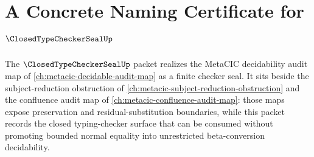 \chapter{A Concrete Naming Certificate for $\ClosedTypeCheckerSealUp$}
\label{ch:concrete-instances-closed-type-checker-seal-namecert}

The $\ClosedTypeCheckerSealUp$ packet realizes the MetaCIC decidability audit map of \autoref{ch:metacic-decidable-audit-map} as a finite checker seal. It sits beside the subject-reduction obstruction of \autoref{ch:metacic-subject-reduction-obstruction} and the confluence audit map of \autoref{ch:metacic-confluence-audit-map}: those maps expose preservation and residual-substitution boundaries, while this packet records the closed typing-checker surface that can be consumed without promoting bounded normal equality into unrestricted beta-conversion decidability.

